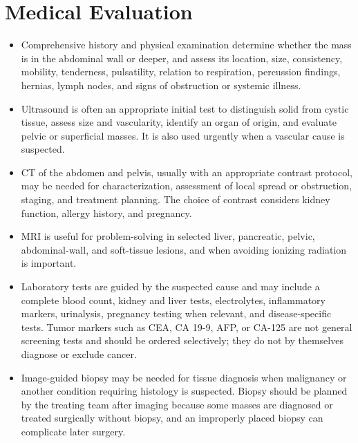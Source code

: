 \section*{Medical Evaluation}
\begin{itemize}
 \item Comprehensive history and physical examination determine whether the mass is in the abdominal wall or deeper, and assess its location, size, consistency, mobility, tenderness, pulsatility, relation to respiration, percussion findings, hernias, lymph nodes, and signs of obstruction or systemic illness.
 \item Ultrasound is often an appropriate initial test to distinguish solid from cystic tissue, assess size and vascularity, identify an organ of origin, and evaluate pelvic or superficial masses. It is also used urgently when a vascular cause is suspected.
 \item CT of the abdomen and pelvis, usually with an appropriate contrast protocol, may be needed for characterization, assessment of local spread or obstruction, staging, and treatment planning. The choice of contrast considers kidney function, allergy history, and pregnancy.
 \item MRI is useful for problem-solving in selected liver, pancreatic, pelvic, abdominal-wall, and soft-tissue lesions, and when avoiding ionizing radiation is important.
 \item Laboratory tests are guided by the suspected cause and may include a complete blood count, kidney and liver tests, electrolytes, inflammatory markers, urinalysis, pregnancy testing when relevant, and disease-specific tests. Tumor markers such as CEA, CA 19-9, AFP, or CA-125 are not general screening tests and should be ordered selectively; they do not by themselves diagnose or exclude cancer.
 \item Image-guided biopsy may be needed for tissue diagnosis when malignancy or another condition requiring histology is suspected. Biopsy should be planned by the treating team after imaging because some masses are diagnosed or treated surgically without biopsy, and an improperly placed biopsy can complicate later surgery.
\end{itemize}

